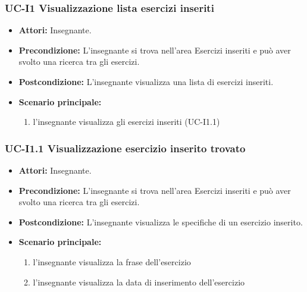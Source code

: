 \subsubsection{UC-I1 Visualizzazione lista esercizi inseriti}
\begin{itemize}
\item \textbf{Attori: }Insegnante.
		\item \textbf{Precondizione: }L'insegnante si trova nell'area Esercizi inseriti e può aver svolto una ricerca tra gli esercizi.
		\item \textbf{Postcondizione: }L'insegnante visualizza una lista di esercizi inseriti. 
		\item \textbf{Scenario principale:}
		\begin{enumerate}
			\item l'insegnante visualizza gli esercizi inseriti (UC-I1.1)
		\end{enumerate}
	\end{itemize}

\subsubsection{UC-I1.1 Visualizzazione esercizio inserito trovato}
\begin{itemize}
\item \textbf{Attori: }Insegnante.
		\item \textbf{Precondizione: }L'insegnante si trova nell'area Esercizi inseriti e può aver svolto una ricerca tra gli esercizi.
		\item \textbf{Postcondizione: }L'insegnante visualizza le specifiche di un esercizio inserito. 
		\item \textbf{Scenario principale:}
		\begin{enumerate}
			\item l'insegnante visualizza la frase dell'esercizio
			\item l'insegnante visualizza la data di inserimento dell'esercizio
		\end{enumerate}
	\end{itemize}

